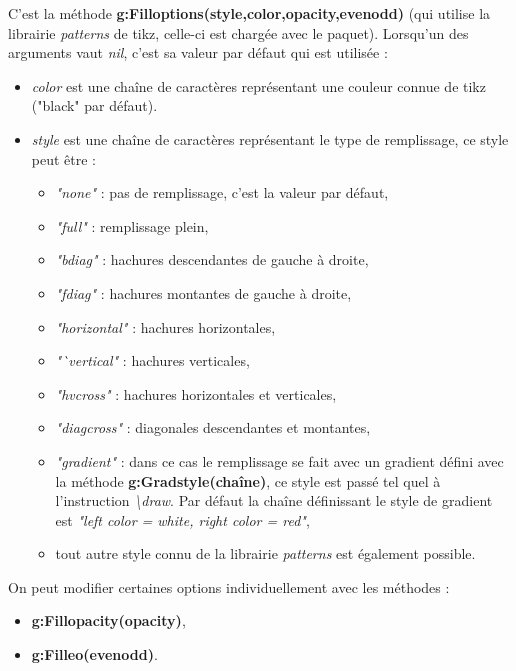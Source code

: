 \documentclass[%
10pt,%
a4paper,%
french,%
]%
{article}%
\begin{document}
C'est la méthode \textbf{g:Filloptions(style,color,opacity,evenodd)} (qui utilise la librairie \emph{patterns} de tikz, celle-ci est chargée avec le paquet). Lorsqu'un des arguments vaut \emph{nil}, c'est sa valeur par défaut qui est utilisée :

\begin{itemize}
  \item \emph{color} est une chaîne de caractères représentant une couleur connue de tikz ("black" par défaut).
  \item \emph{style} est une chaîne de caractères représentant le type de remplissage, ce style peut être :
      \begin{itemize}
      \item \emph{"none"} : pas de remplissage, c'est la valeur par défaut,
      \item \emph{"full"} : remplissage plein,
      \item \emph{"bdiag"} : hachures descendantes de gauche à droite,
      \item \emph{"fdiag"} : hachures montantes de gauche à droite,
      \item \emph{"horizontal"} : hachures horizontales,
      \item \emph{"`vertical"} : hachures verticales,
      \item \emph{"hvcross"} : hachures horizontales et verticales,
      \item \emph{"diagcross"} : diagonales descendantes et montantes,
      \item \emph{"gradient"} : dans ce cas le remplissage se fait avec un gradient défini avec la méthode \textbf{g:Gradstyle(chaîne)}, ce style est passé tel quel à l'instruction \emph{\textbackslash draw}. Par défaut la chaîne définissant le style de gradient est \emph{"left color = white, right color = red"},
      \item tout autre style connu de la librairie \emph{patterns} est également possible.
      \end{itemize}
\end{itemize}

On peut modifier certaines options individuellement avec les méthodes :
\begin{itemize}
    \item \textbf{g:Fillopacity(opacity)}, 
    \item \textbf{g:Filleo(evenodd)}.
\end{itemize}
\end{document}
